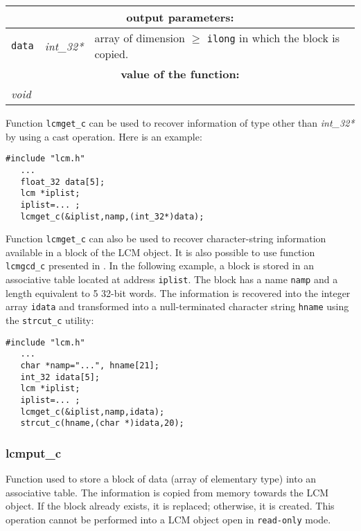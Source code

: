 \vskip 0.8cm

\noindent
\begin{tabular}{|p{1.5cm}|p{2cm}|p{11cm}|}
\hline
\multicolumn{3}{|c|}{\bf output parameters:} \\
\hline
{\tt data} & {\it int\_32*} & array of dimension $\ge$ {\tt ilong} in which the block is copied. \\
\hline
\multicolumn{3}{|c|}{\bf value of the function:} \\
\hline
\multicolumn{2}{|l|}{\it void} &  \\
\hline
\end{tabular}

\vskip 0.8cm

Function {\tt lcmget\_c} can be used to recover information of type other than {\it int\_32*} by using a
cast operation. Here is an example:

\begin{verbatim}
#include "lcm.h"
   ...
   float_32 data[5];
   lcm *iplist;
   iplist=... ;
   lcmget_c(&iplist,namp,(int_32*)data);
\end{verbatim}

\vskip 0.2cm

Function {\tt lcmget\_c} can also be used to recover character-string information available in a block
of the LCM object. It is also possible to use function {\tt lcmgcd\_c} presented in .
In the following example, a block is stored in an associative table located at
address {\tt iplist}. The block has a name {\tt namp} and a length equivalent to 5 32-bit words.
The information is recovered into the integer array {\tt idata} and transformed into a null-terminated
character string {\tt hname}  using the {\tt strcut\_c} utility:

\begin{verbatim}
#include "lcm.h"
   ...
   char *namp="...", hname[21];
   int_32 idata[5];
   lcm *iplist;
   iplist=... ;
   lcmget_c(&iplist,namp,idata);
   strcut_c(hname,(char *)idata,20);
\end{verbatim}

\subsubsection{lcmput\_c}

Function used to store a block of data (array of elementary type) into an associative table. 
The information is copied from memory towards the LCM object. If the block already exists, it is replaced;
otherwise, it is created. This operation cannot be performed into a LCM object open in {\tt read-only} mode.

